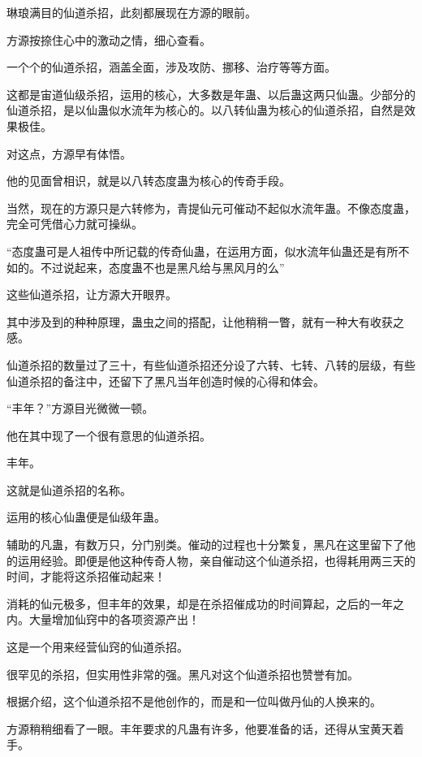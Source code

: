 
\begin{this_body}

琳琅满目的仙道杀招，此刻都展现在方源的眼前。

方源按捺住心中的激动之情，细心查看。

一个个的仙道杀招，涵盖全面，涉及攻防、挪移、治疗等等方面。

这都是宙道仙级杀招，运用的核心，大多数是年蛊、以后蛊这两只仙蛊。少部分的仙道杀招，是以仙蛊似水流年为核心的。以八转仙蛊为核心的仙道杀招，自然是效果极佳。

对这点，方源早有体悟。

他的见面曾相识，就是以八转态度蛊为核心的传奇手段。

当然，现在的方源只是六转修为，青提仙元可催动不起似水流年蛊。不像态度蛊，完全可凭借心力就可操纵。

“态度蛊可是人祖传中所记载的传奇仙蛊，在运用方面，似水流年仙蛊还是有所不如的。不过说起来，态度蛊不也是黑凡给与黑风月的么”

这些仙道杀招，让方源大开眼界。

其中涉及到的种种原理，蛊虫之间的搭配，让他稍稍一瞥，就有一种大有收获之感。

仙道杀招的数量过了三十，有些仙道杀招还分设了六转、七转、八转的层级，有些仙道杀招的备注中，还留下了黑凡当年创造时候的心得和体会。

“丰年？”方源目光微微一顿。

他在其中现了一个很有意思的仙道杀招。

丰年。

这就是仙道杀招的名称。

运用的核心仙蛊便是仙级年蛊。

辅助的凡蛊，有数万只，分门别类。催动的过程也十分繁复，黑凡在这里留下了他的运用经验。即便是他这种传奇人物，亲自催动这个仙道杀招，也得耗用两三天的时间，才能将这杀招催动起来！

消耗的仙元极多，但丰年的效果，却是在杀招催成功的时间算起，之后的一年之内。大量增加仙窍中的各项资源产出！

这是一个用来经营仙窍的仙道杀招。

很罕见的杀招，但实用性非常的强。黑凡对这个仙道杀招也赞誉有加。

根据介绍，这个仙道杀招不是他创作的，而是和一位叫做丹仙的人换来的。

方源稍稍细看了一眼。丰年要求的凡蛊有许多，他要准备的话，还得从宝黄天着手。


\end{this_body}
